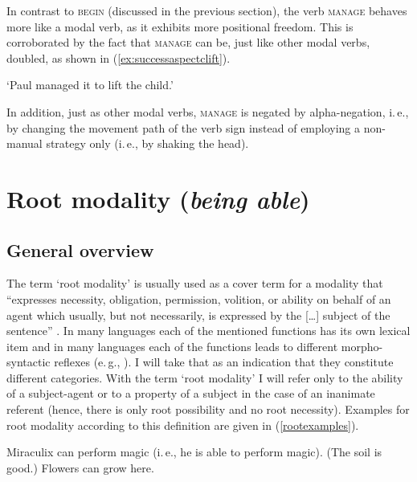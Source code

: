 \noindent In contrast to \textsc{begin} (discussed in the previous section), the verb \textsc{manage} behaves more like a modal verb, as it exhibits more positional freedom. This is corroborated by the fact that \textsc{manage} can be, just like other modal verbs, doubled, as shown in (\ref{ex:successaspectclift}).

\begin{exe}
\glt `Paul managed it to lift the child.' \label{ex:successaspectclift}
\end{exe} 

\noindent In addition, just as other modal verbs, \textsc{manage} is negated by alpha-negation, i.\,e., by changing the movement path of the verb sign instead of employing a non-manual strategy only (i.\,e., by shaking the head).


\section{Root modality (\textit{being able})}\label{rootmodality}
\subsection{General overview}
The term `root modality' is usually used as a cover term for a modality that ``expresses necessity, obligation, permission, volition, or ability on behalf of an agent which usually, but not necessarily, is expressed by the [\dots ] subject of the sentence'' \citep[44]{platzack1979semantic}. In many languages each of the mentioned functions has its own lexical item and in many languages each of the functions leads to different morpho-syntactic reflexes (e.\,g., \citealt{bross2017swabian}). I will take that as an indication that they constitute different categories. With the term `root modality' I will refer only to the ability of a subject-agent or to a property of a subject in the case of an inanimate referent (hence, there is only root possibility and no root necessity). Examples for root modality according to this definition are given in (\ref{rootexamples}).

\begin{exe}
\ex\label{rootexamples}\begin{xlist}
\ex Miraculix can perform magic (i.\,e., he is able to perform magic).
\ex (The soil is good.) Flowers can grow here.
\end{xlist}
\end{exe}

